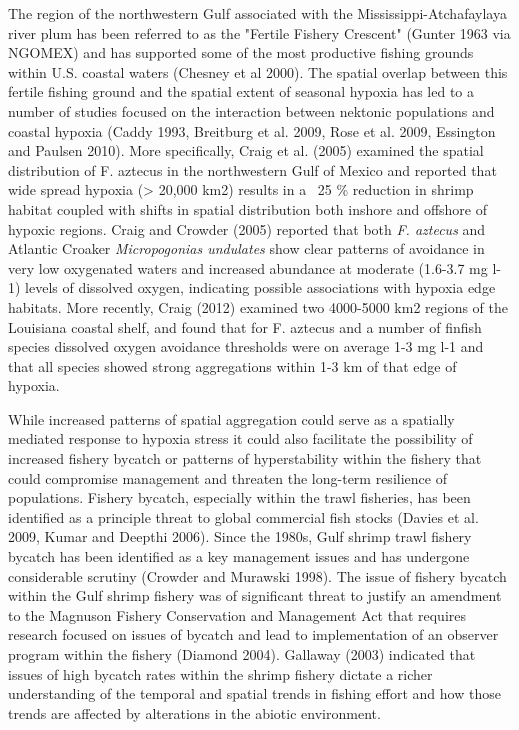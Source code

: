 \documentclass[10pt]{article}
\begin{document}
The region of the northwestern Gulf associated with the Mississippi-Atchafaylaya river plum has been referred to as the "Fertile Fishery Crescent" (Gunter 1963 via NGOMEX) and has supported some of the most productive fishing grounds within U.S. coastal waters (Chesney et al 2000).  The spatial overlap between this fertile fishing ground and the spatial extent of seasonal hypoxia has led to a number of studies focused on the interaction between nektonic populations and coastal hypoxia (Caddy 1993, Breitburg et al. 2009, Rose et al. 2009, Essington and Paulsen 2010).  More specifically, Craig et al. (2005) examined the spatial distribution of F. aztecus in the northwestern Gulf of Mexico and reported that wide spread hypoxia (> 20,000 km2) results in a ~25 \% reduction in shrimp habitat coupled with shifts in spatial distribution both inshore and offshore of hypoxic regions.  Craig and Crowder (2005) reported that both \textit{F. aztecus} and Atlantic Croaker \textit{Micropogonias undulates} show clear patterns of avoidance in very low oxygenated waters and increased abundance at moderate (1.6-3.7 mg l-1) levels of dissolved oxygen, indicating possible associations with hypoxia edge habitats.  More recently, Craig (2012) examined two 4000-5000 km2 regions of the Louisiana coastal shelf, and found that for F. aztecus and a number of finfish species dissolved oxygen avoidance thresholds were on average 1-3 mg l-1 and that all species showed strong aggregations within 1-3 km of that edge of hypoxia.  

While increased patterns of spatial aggregation could serve as a spatially mediated response to hypoxia stress it could also facilitate the possibility of increased fishery bycatch or patterns of hyperstability within the fishery that could compromise management and threaten the long-term resilience of populations.  Fishery bycatch, especially within the trawl fisheries, has been identified as a principle threat to global commercial fish stocks (Davies et al. 2009, Kumar and Deepthi 2006).  Since the 1980s, Gulf shrimp trawl fishery bycatch has been identified as a key management issues and has undergone considerable scrutiny (Crowder and Murawski 1998).  The issue of fishery bycatch within the Gulf shrimp fishery was of significant threat to justify an amendment to the Magnuson Fishery Conservation and Management Act that requires research focused on issues of bycatch and lead to implementation of an observer program within the fishery (Diamond 2004).  Gallaway (2003) indicated that issues of high bycatch rates within the shrimp fishery dictate a richer understanding of the temporal and spatial trends in fishing effort and how those trends are affected by alterations in the abiotic environment.  
\end{document}
